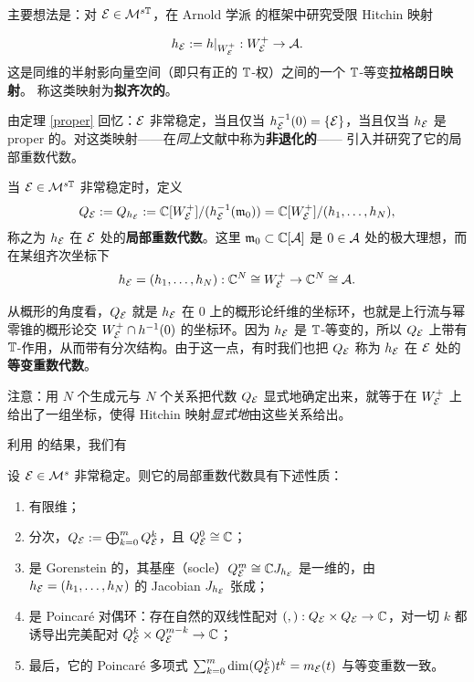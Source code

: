 主要想法是：对 ${\mathcal E}\in {\mathcal{M}}^{s{\mathbb{T}}}$，在 Arnold 学派 \cite{arnold-etal} 的框架中研究受限 Hitchin 映射

\[
h_{\mathcal E}:=h|_{W^+_{\mathcal E}}: W^+_{\mathcal E}\to {\mathcal{A}}.
\]
这是同维的半射影向量空间（即只有正的 ${\mathbb{T}}$-权）之间的一个 ${\mathbb{T}}$-等变\textbf{拉格朗日映射}。\cite[\S 12.3]{arnold-etal} 称这类映射为\textbf{拟齐次的}。

由定理 \ref{proper} 回忆：${\mathcal E}$ 非常稳定，当且仅当 $h_{\mathcal E}^{-1}(0)=\{{\mathcal E}\}$，当且仅当 $h_{\mathcal E}$ 是 proper 的。对这类映射——在\emph{同上}文献中称为\textbf{非退化的}——\cite[\S 4,5,12]{arnold-etal} 引入并研究了它的局部重数代数。

\begin{definition}
当 ${\mathcal E}\in {\mathcal{M}}^{s{\mathbb{T}}}$ 非常稳定时，定义
\[
Q_{\mathcal E}:=Q_{h_{\mathcal E}}:= \mathbb{C}[W^+_{\mathcal E}]/(h_{\mathcal E}^{-1}({\mathfrak m}_0))=\mathbb{C}[W^+_{\mathcal E}]/(h_1,\dots,h_N),
\]
称之为 $h_{\mathcal E}$ 在 ${\mathcal E}$ 处的\textbf{局部重数代数}。这里 ${\mathfrak m}_0\subset \mathbb{C}[{\mathcal{A}}]$ 是 $0\in {\mathcal{A}}$ 处的极大理想，而在某组齐次坐标下
\[
h_{\mathcal E}=(h_1,\dots,h_N):\mathbb{C}^N\cong W^+_{\mathcal E}\to \mathbb{C}^N\cong {\mathcal{A}}.
\]
\end{definition}

从概形的角度看，$Q_{\mathcal E}$ 就是 $h_{\mathcal E}$ 在 $0$ 上的概形论纤维的坐标环，也就是上行流与幂零锥的概形论交 $W^+_{\mathcal E}\cap h^{-1}(0)$ 的坐标环。因为 $h_{\mathcal E}$ 是 ${\mathbb{T}}$-等变的，所以 $Q_{\mathcal E}$ 上带有 ${\mathbb{T}}$-作用，从而带有分次结构。由于这一点，有时我们也把 $Q_{\mathcal E}$ 称为 $h_{\mathcal E}$ 在 ${{\mathcal E}}$ 处的\textbf{等变重数代数}。

\begin{remark}
注意：用 $N$ 个生成元与 $N$ 个关系把代数 $Q_{\mathcal E}$ 显式地确定出来，就等于在 $W^+_{\mathcal E}$ 上给出了一组坐标，使得 Hitchin 映射\emph{显式地}由这些关系给出。
\end{remark}

利用 \cite[\S 4,5,12]{arnold-etal} 的结果，我们有

\begin{theorem}
设 ${\mathcal E}\in {\mathcal{M}}^s$ 非常稳定。则它的局部重数代数具有下述性质：\begin{enumerate}\item 有限维；\item 分次，$Q_{\mathcal E}:=\bigoplus_{k=0}^m Q_{\mathcal E}^k$，且 $Q_{\mathcal E}^0\cong \mathbb{C}$；\item 是 Gorenstein 的，其基座（socle）$Q^m_{\mathcal E}\cong \mathbb{C} J_{h_{\mathcal E}}$ 是一维的，由 $h_{\mathcal E}=(h_1,\dots,h_N)$ 的 Jacobian $J_{h_{\mathcal E}}$ 张成；\item 是 Poincaré 对偶环：存在自然的双线性配对 $(,):Q_{\mathcal E}\times Q_{\mathcal E} \to \mathbb{C}$，对一切 $k$ 都诱导出完美配对 $Q_{\mathcal E}^k\times Q_{\mathcal E}^{m-k}\to \mathbb{C}$；\item 最后，它的 Poincaré 多项式 $\sum_{k=0}^m \dim(Q^k_{\mathcal E}) t^k=m_{\mathcal E}(t)$ 与等变重数一致。\end{enumerate}
\end{theorem}

